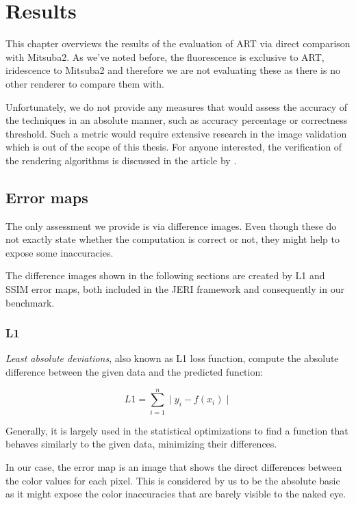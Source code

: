 \chapter{Results}
\label{chap:results}

This chapter overviews the results of the evaluation of ART via direct comparison with Mitsuba2. As we've noted before, the fluorescence is exclusive to ART, iridescence to Mitsuba2 and therefore we are not evaluating these as there is no other renderer to compare them with.

Unfortunately, we do not provide any measures that would assess the accuracy of the techniques in an absolute manner, such as accuracy percentage or correctness threshold. Such a metric would require extensive research in the image validation which is out of the scope of this thesis. For anyone interested, the verification of the rendering algorithms is discussed in the article by \citet{ulbricht2006verification}.

\section{Error maps}

The only assessment we provide is via difference images. Even though these do not exactly state whether the computation is correct or not, they might help to expose some inaccuracies.

The difference images shown in the following sections are created by L1 and SSIM error maps, both included in the JERI framework and consequently in our benchmark. 

\subsection{L1}

\emph{Least absolute deviations}, also known as L1 loss function, compute the absolute difference between the given data and the predicted function:

\begin{equation}
L1=\sum_{i=1}^{n}\mid y_i - f(x_i) \mid
\end{equation}

Generally, it is largely used in the statistical optimizations to find a function that behaves similarly to the given data, minimizing their differences.

In our case, the error map is an image that shows the direct differences between the color values for each pixel. This is considered by us to be the absolute basic as it might expose the color inaccuracies that are barely visible to the naked eye.

